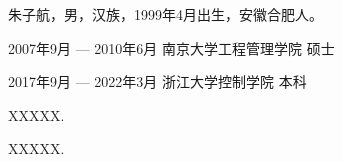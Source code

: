 \documentclass[master,oneside,winfonts]{njuthesis/njuthesis}
\begin{document}
\begin{resume}
    \begin{authorinfo}
        \noindent 朱子航，男，汉族，1999年4月出生，安徽合肥人。
    \end{authorinfo}
    \begin{education}
    \item[2007年9月 --- 2010年6月] 南京大学工程管理学院 \hfill 硕士
    \item[2017年9月 --- 2022年3月] 浙江大学控制学院 \hfill 本科
    \end{education}
    \begin{publications}
        \item XXXXX.
        \item XXXXX.
    \end{publications}
\end{resume}
\end{document}
